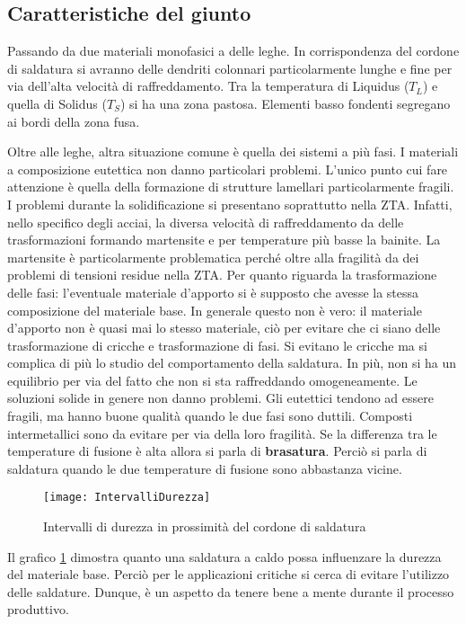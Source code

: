 \subsection{Caratteristiche del giunto}
Passando da due materiali monofasici a delle leghe.
In corrispondenza del cordone di saldatura si avranno delle dendriti colonnari particolarmente lunghe e fine per via dell'alta velocità di raffreddamento.
Tra la temperatura di Liquidus ($T_L$) e quella di Solidus ($T_S$) si ha una zona pastosa.
Elementi basso fondenti segregano ai bordi della zona fusa.

Oltre alle leghe, altra situazione comune è quella dei sistemi a più fasi.
I materiali a composizione eutettica non danno particolari problemi. L'unico punto cui fare attenzione è quella della formazione di strutture lamellari particolarmente fragili.
I problemi durante la solidificazione si presentano soprattutto nella \ac{ZTA}.
Infatti, nello specifico degli acciai, la diversa velocità di raffreddamento da delle trasformazioni formando martensite e per temperature più basse la bainite.
La martensite è particolarmente problematica perché oltre alla fragilità da dei problemi di tensioni residue nella \ac{ZTA}.
Per quanto riguarda la trasformazione delle fasi: l'eventuale materiale d'apporto si è supposto che avesse la stessa composizione del materiale base. In generale questo non è vero: il materiale d'apporto non è quasi mai lo stesso materiale, ciò per evitare che ci siano delle trasformazione di cricche e trasformazione di fasi.
Si evitano le cricche ma si complica di più lo studio del comportamento della saldatura. In più, non si ha un equilibrio per via del fatto che non si sta raffreddando omogeneamente.
Le soluzioni solide in genere non danno problemi.
Gli eutettici tendono ad essere fragili, ma hanno buone qualità quando le due fasi sono duttili.
Composti intermetallici sono da evitare per via della loro fragilità.
Se la differenza tra le temperature di fusione è alta allora si parla di \textbf{brasatura}.
Perciò si parla di saldatura quando le due temperature di fusione sono abbastanza vicine.

\begin{figure}
\centering
\texttt{[image: IntervalliDurezza]}
\caption{Intervalli di durezza in prossimità del cordone di saldatura}
\label{fig:IntervalliDurezza}
\end{figure}

Il grafico \ref{fig:IntervalliDurezza} dimostra quanto una saldatura a caldo possa influenzare la durezza del materiale base. Perciò per le applicazioni critiche si cerca di evitare l'utilizzo delle saldature. Dunque, è un aspetto da tenere bene a mente durante il processo produttivo.

